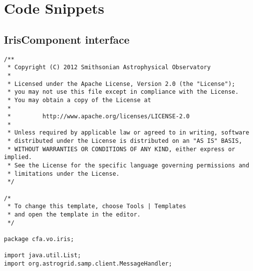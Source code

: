 \section{Code Snippets}
\subsection{IrisComponent interface}
\label{lst:component}
\begin{verbatim}
/**
 * Copyright (C) 2012 Smithsonian Astrophysical Observatory
 *
 * Licensed under the Apache License, Version 2.0 (the "License");
 * you may not use this file except in compliance with the License.
 * You may obtain a copy of the License at
 *
 *         http://www.apache.org/licenses/LICENSE-2.0
 *
 * Unless required by applicable law or agreed to in writing, software
 * distributed under the License is distributed on an "AS IS" BASIS,
 * WITHOUT WARRANTIES OR CONDITIONS OF ANY KIND, either express or implied.
 * See the License for the specific language governing permissions and
 * limitations under the License.
 */

/*
 * To change this template, choose Tools | Templates
 * and open the template in the editor.
 */

package cfa.vo.iris;

import java.util.List;
import org.astrogrid.samp.client.MessageHandler;


\end{verbatim}
